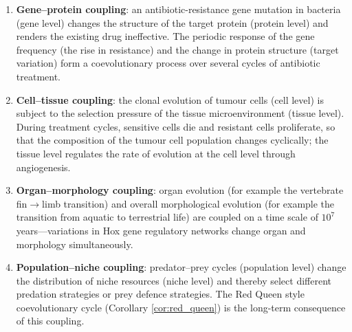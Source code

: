 \begin{example}
\leavevmode\par
\begin{enumerate}[label=(\roman*)]
    \item \textbf{Gene--protein coupling}: an antibiotic-resistance gene mutation in bacteria (gene level) changes the structure of the target protein (protein level) and renders the existing drug ineffective. The periodic response of the gene frequency (the rise in resistance) and the change in protein structure (target variation) form a coevolutionary process over several cycles of antibiotic treatment.
    \item \textbf{Cell--tissue coupling}: the clonal evolution of tumour cells (cell level) is subject to the selection pressure of the tissue microenvironment (tissue level). During treatment cycles, sensitive cells die and resistant cells proliferate, so that the composition of the tumour cell population changes cyclically; the tissue level regulates the rate of evolution at the cell level through angiogenesis.
    \item \textbf{Organ--morphology coupling}: organ evolution (for example the vertebrate fin$\to$limb transition) and overall morphological evolution (for example the transition from aquatic to terrestrial life) are coupled on a time scale of $10^7$ years---variations in Hox gene regulatory networks change organ and morphology simultaneously.
    \item \textbf{Population--niche coupling}: predator--prey cycles (population level) change the distribution of niche resources (niche level) and thereby select different predation strategies or prey defence strategies. The Red Queen style coevolutionary cycle (Corollary \ref{cor:red_queen}) is the long-term consequence of this coupling.
\end{enumerate}
\end{example}

